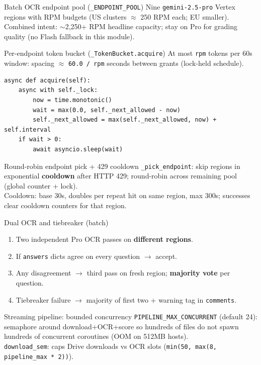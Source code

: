 \documentclass[aspectratio=169]{beamer}
\begin{document}
\begin{frame}{Batch OCR endpoint pool (\texttt{\_ENDPOINT\_POOL})}
  \tiny
  Nine \texttt{gemini-2.5-pro} Vertex regions with RPM budgets (US clusters $\approx$ 250 RPM each; EU smaller). Combined intent: $\sim$2{,}250+ RPM headline capacity; stay on Pro for grading quality (no Flash fallback in this module).
\end{frame}

\begin{frame}[fragile]{Per-endpoint token bucket (\texttt{\_TokenBucket.acquire})}
  \footnotesize
  At most \texttt{rpm} tokens per 60s window: spacing $\approx$ \texttt{60.0 / rpm} seconds between grants (lock-held schedule).
\begin{lstlisting}[style=py]
async def acquire(self):
    async with self._lock:
        now = time.monotonic()
        wait = max(0.0, self._next_allowed - now)
        self._next_allowed = max(self._next_allowed, now) + self.interval
    if wait > 0:
        await asyncio.sleep(wait)
\end{lstlisting}
\end{frame}

\begin{frame}{Round-robin endpoint pick + 429 cooldown}
  \small
  \texttt{\_pick\_endpoint}: skip regions in exponential \textbf{cooldown} after HTTP 429; round-robin across remaining pool (global counter + lock).\\
  Cooldown: base 30s, doubles per repeat hit on same region, max 300s; successes clear cooldown counters for that region.
\end{frame}

\begin{frame}{Dual OCR and tiebreaker (batch)}
  \small
  \begin{enumerate}
    \item Two independent Pro OCR passes on \textbf{different regions}.
    \item If \texttt{answers} dicts agree on every question $\rightarrow$ accept.
    \item Any disagreement $\rightarrow$ third pass on fresh region; \textbf{majority vote} per question.
    \item Tiebreaker failure $\rightarrow$ majority of first two + warning tag in \texttt{comments}.
  \end{enumerate}
\end{frame}

\begin{frame}{Streaming pipeline: bounded concurrency}
  \small
  \texttt{PIPELINE\_MAX\_CONCURRENT} (default 24): semaphore around download+OCR+score so hundreds of files do not spawn hundreds of concurrent coroutines (OOM on 512MB hosts).\\
  \texttt{download\_sem}: caps Drive downloads vs OCR slots (\texttt{min(50, max(8, pipeline\_max * 2))}).
\end{frame}
\end{document}
